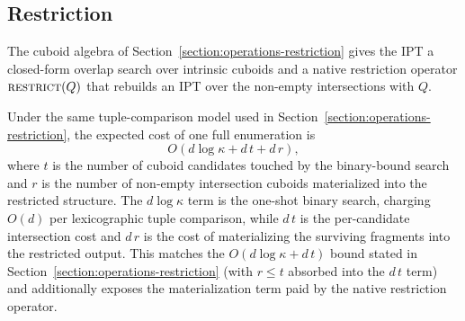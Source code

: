 \documentclass[manuscript,screen,review]{acmart}
\theoremstyle{definition}
\theoremstyle{plain}
\begin{document}
\subsection{Restriction}
\label{section:results-selection}

The cuboid algebra of Section~\ref{section:operations-restriction}
gives the IPT a closed-form overlap search over intrinsic cuboids and a
native restriction operator $\textsc{restrict}(Q)$ that rebuilds an
IPT over the non-empty intersections with $Q$.

Under the same tuple-comparison model used in
Section~\ref{section:operations-restriction}, the expected cost of one
full enumeration is
\[
  O(d\log\kappa + d\,t + d\,r),
\]
where $t$ is the number of cuboid candidates touched by the binary-bound
search and $r$ is the number of non-empty intersection cuboids
materialized into the restricted structure. The $d\log\kappa$ term is
the one-shot binary search, charging $O(d)$ per lexicographic tuple
comparison, while $d\,t$ is the per-candidate intersection cost and
$d\,r$ is the cost of materializing the surviving fragments into the
restricted output. This matches the $O(d\log\kappa + d\,t)$ bound stated in
Section~\ref{section:operations-restriction} (with $r\le t$ absorbed
into the $d\,t$ term) and additionally exposes the materialization term
paid by the native restriction operator.

\begin{table}[ht]
\caption{Native \texttt{restrict} time ratios relative to IPT. The
  structured 3D column reports geometric means over the four
  structured restriction scenarios, the 27 steady-state restriction
  specifications, and the 21 platform/compiler runs. The 5D column
  reports geometric means over the \texttt{multiple-survey-9-5d}
  stress scenario, the 19 steady-state distribution specifications,
  and the same 21 platform/compiler runs. Blank cells mark layouts
  that are not part of that benchmark.}
\label{table:restrict-summary}

\end{table}
\end{document}
